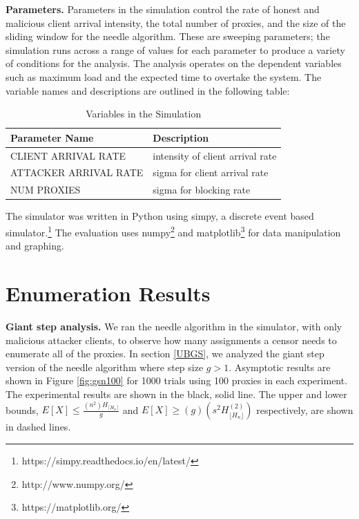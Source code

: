 
\textbf{Parameters.} Parameters in the simulation control the rate of honest and malicious client arrival intensity, the total number of proxies, and the size of the sliding window for the needle algorithm. These are sweeping parameters; the simulation runs across a range of values for each parameter to produce a variety of conditions for the analysis. The analysis operates on the dependent variables such as maximum load and the expected time to overtake the system. The variable names and descriptions are outlined in the following table:

\begin{table}[h]
  \centering
	\begin{tabular}{ll}
	\hline
	\cline{1-2}
	Parameter Name   & Description  \\
	\hline
    CLIENT ARRIVAL RATE & intensity of client arrival rate \\
	ATTACKER ARRIVAL RATE      & sigma for client arrival rate \\
	NUM PROXIES      & sigma for blocking rate \\
	\hline
	\end{tabular}
  \caption{Variables in the Simulation}
  \label{tab:vars}
\end{table}

The simulator was written in Python using simpy, a discrete event based simulator.\footnote{https://simpy.readthedocs.io/en/latest/} The evaluation uses numpy\footnote{http://www.numpy.org/} and matplotlib\footnote{https://matplotlib.org/} for data manipulation and graphing.

\section{Enumeration Results}

\textbf{Giant step analysis.} We ran the needle algorithm in the simulator, with only malicious attacker clients, to observe how many assignments a censor needs to enumerate all of the proxies. In section \ref{UBGS}, we analyzed the giant step version of the needle algorithm where step size $g > 1$. Asymptotic results are shown in Figure \ref{fig:gsn100} for 1000 trials using 100 proxies in each experiment. The experimental results are shown in the black, solid line. The upper and lower bounds, $E[X] \leq \frac{(n^2)H_{\lceil{H_n}\rceil}}{g}$ and $E[X] \geq (g)(s^2H^{(2)}_{\lfloor{H_n}\rfloor})$ respectively, are shown in dashed lines.

